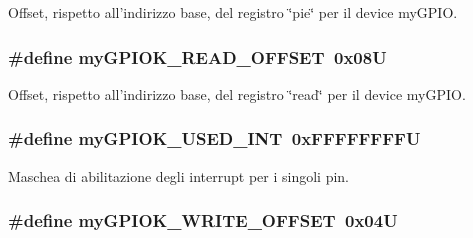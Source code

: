 Offset, rispetto all'indirizzo base, del registro \char`\"{}pie\char`\"{} per il device my\+G\+P\+I\+O. 

\hypertarget{group___linux-_driver_gabdb25f3ecdfbf053f4ca207930a56599}{
\subsubsection[{my\+G\+P\+I\+O\+K\+\_\+\+R\+E\+A\+D\+\_\+\+O\+F\+F\+S\+E\+T}]{\setlength{\rightskip}{0pt plus 5cm}\#define my\+G\+P\+I\+O\+K\+\_\+\+R\+E\+A\+D\+\_\+\+O\+F\+F\+S\+E\+T~0x08\+U}}\label{group___linux-_driver_gabdb25f3ecdfbf053f4ca207930a56599}


Offset, rispetto all'indirizzo base, del registro \char`\"{}read\char`\"{} per il device my\+G\+P\+I\+O. 

\hypertarget{group___linux-_driver_ga78d3a23bb3381a43eaba8bbf8b1cc750}{
\subsubsection[{my\+G\+P\+I\+O\+K\+\_\+\+U\+S\+E\+D\+\_\+\+I\+N\+T}]{\setlength{\rightskip}{0pt plus 5cm}\#define my\+G\+P\+I\+O\+K\+\_\+\+U\+S\+E\+D\+\_\+\+I\+N\+T~0x\+F\+F\+F\+F\+F\+F\+F\+F\+U}}\label{group___linux-_driver_ga78d3a23bb3381a43eaba8bbf8b1cc750}


Maschea di abilitazione degli interrupt per i singoli pin. 

\hypertarget{group___linux-_driver_gac165a5d828f3df41e78bb02d4ef38327}{
\subsubsection[{my\+G\+P\+I\+O\+K\+\_\+\+W\+R\+I\+T\+E\+\_\+\+O\+F\+F\+S\+E\+T}]{\setlength{\rightskip}{0pt plus 5cm}\#define my\+G\+P\+I\+O\+K\+\_\+\+W\+R\+I\+T\+E\+\_\+\+O\+F\+F\+S\+E\+T~0x04\+U}}\label{group___linux-_driver_gac165a5d828f3df41e78bb02d4ef38327}


